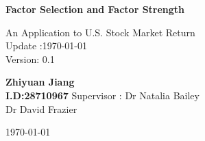 \begin{titlepage}
\begin{center}
\vspace*{1cm}
\Huge
\textbf{Factor Selection and Factor Strength}

\vspace{0.5cm}
\LARGE
An Application to U.S. Stock Market Return\\
\Large
Update :\today \\
Version: 0.1

\vspace{1.5 cm}
\textbf{Zhiyuan Jiang\\I.D:28710967}
\vfill
 Supervisor : Dr Natalia Bailey\\\hspace{30mm} Dr David Frazier
 \vspace{0.8cm}
 
\Large
\today
\end{center}
\end{titlepage}